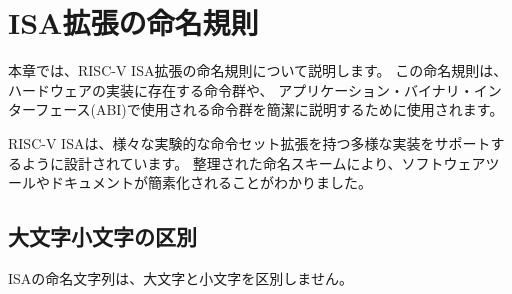 \begin{comment}
\chapter{ISA Extension Naming Conventions}
\end{comment}
\chapter{ISA拡張の命名規則}
\label{naming}

\begin{comment}
This chapter describes the RISC-V ISA extension naming scheme that is
used to concisely describe the set of instructions present in a
hardware implementation, or the set of instructions used by an
application binary interface (ABI).
\end{comment}
本章では、RISC-V ISA拡張の命名規則について説明します。
この命名規則は、ハードウェアの実装に存在する命令群や、
アプリケーション・バイナリ・インターフェース(ABI)で使用される命令群を簡潔に説明するために使用されます。

\begin{commentary}
\begin{comment}
The RISC-V ISA is designed to support a wide variety of
implementations with various experimental instruction-set extensions.
We have found that an organized naming scheme simplifies software
tools and documentation.
\end{comment}
RISC-V ISAは、様々な実験的な命令セット拡張を持つ多様な実装をサポートするように設計されています。
整理された命名スキームにより、ソフトウェアツールやドキュメントが簡素化されることがわかりました。
\end{commentary}

\begin{comment}
\section{Case Sensitivity}
\end{comment}
\section{大文字小文字の区別}

\begin{comment}
The ISA naming strings are case insensitive.
\end{comment}
ISAの命名文字列は、大文字と小文字を区別しません。

